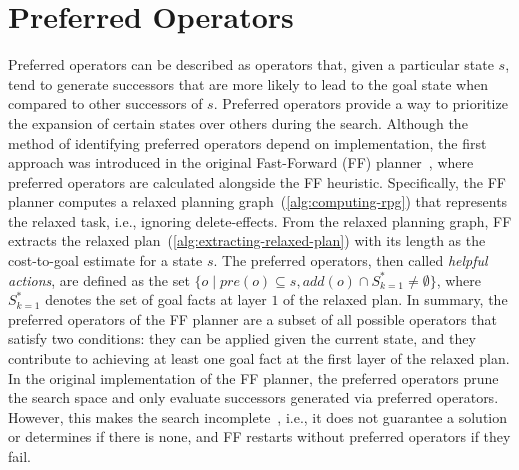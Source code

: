 \documentclass[ppgc,diss,english]{iiufrgs}
\begin{document}
\section{Preferred Operators}
\label{sec:background-preferred-operators}
Preferred operators can be described as operators that, given a particular state $s$, tend to generate successors that are more likely to lead to the goal state when compared to other successors of $s$. Preferred operators provide a way to prioritize the expansion of certain states over others during the search. Although the method of identifying preferred operators depend on implementation, the first approach was introduced in the original Fast-Forward (FF) planner~\cite{Hoffmann.Nebel/2001}, where preferred operators are calculated alongside the FF heuristic.
Specifically, the FF planner computes a relaxed planning graph~(\cref{alg:computing-rpg}) that represents the relaxed task, i.e., ignoring delete-effects. From the relaxed planning graph, FF extracts the relaxed plan~(\cref{alg:extracting-relaxed-plan}) with its length as the cost-to-goal estimate for a state $s$. The preferred operators, then called \emph{helpful actions}, are defined as the set $\{o \mid pre(o) \subseteq s, add(o) \cap S_{k=1}^{*} \neq \emptyset \}$, where $S_{k=1}^{*}$ denotes the set of goal facts at layer $1$ of the relaxed plan. In summary, the preferred operators of the FF planner are a subset of all possible operators that satisfy two conditions: they can be applied given the current state, and they contribute to achieving at least one goal fact at the first layer of the relaxed plan. In the original implementation of the FF planner, the preferred operators prune the search space and only evaluate successors generated via preferred operators. However, this makes the search incomplete~\cite{Richter.Helmert/2009}, i.e., it does not guarantee a solution or determines if there is none, and FF restarts without preferred operators if they fail.
\end{document}
